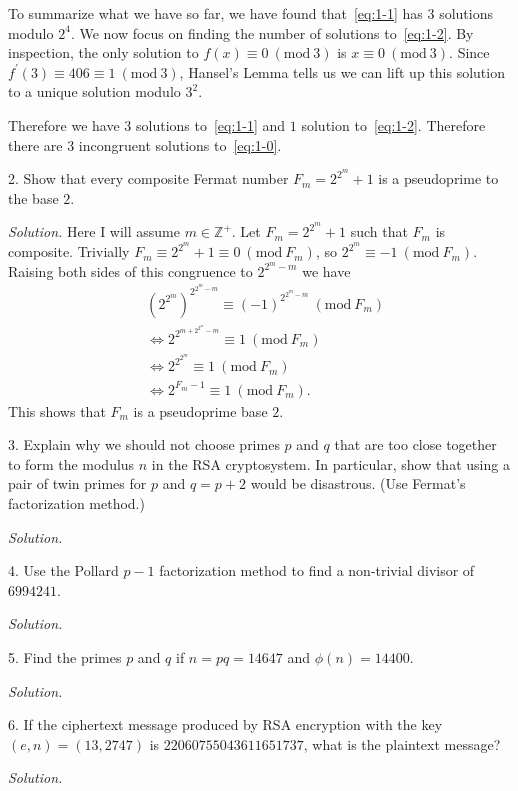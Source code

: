 \documentclass{article}
\newcommand{\Mod}[1]{\ (\mathrm{mod}\ #1)}
\newcommand{\Z}{\mathbb{Z}}
\begin{document}
To summarize what we have so far, we have found that~\eqref{eq:1-1} has
$3$ solutions modulo $2^4$. We now focus on finding the number of solutions
to~\eqref{eq:1-2}. By inspection, the only solution to $f(x) \equiv 0 \Mod 3$
is $x \equiv 0 \Mod 3$. Since $f^\prime(3) \equiv 406 \equiv 1 \Mod 3$,
Hansel's Lemma tells us we can lift up this solution to a unique solution
modulo $3^2$.

Therefore we have $3$ solutions to~\eqref{eq:1-1} and $1$ solution
to~\eqref{eq:1-2}. Therefore there are $3$ incongruent solutions
to~\eqref{eq:1-0}.

\newpage

2. Show that every composite Fermat number $F_m = 2^{2^m} + 1$ is a
pseudoprime to the base $2$.

\textit{Solution.}
Here I will assume $m \in \Z^+$. Let $F_m= 2^{2^m} + 1$ such that $F_m$
is composite. Trivially $F_m \equiv 2^{2^m} + 1 \equiv 0 \Mod{F_m}$,
so $2^{2^m} \equiv -1 \Mod{F_m}$. Raising both sides of this congruence
to $2^{2^m - m}$ we have
%
\begin{align*}
    &(2^{2^m})^{2^{2^m - m}} \equiv (-1)^{2^{2^m - m}} \Mod{F_m} \\
    &\iff 2^{2^{m + 2^{2^m} - m}} \equiv 1 \Mod{F_m} \\
    &\iff 2^{2^{2^m}} \equiv 1 \Mod{F_m} \\
    &\iff 2^{F_m - 1} \equiv 1 \Mod{F_m}
    .
\end{align*}
%
This shows that $F_m$ is a pseudoprime base $2$.

\newpage

3. Explain why we should not choose primes $p$ and $q$ that are too close
together to form the modulus $n$ in the RSA cryptosystem. In particular,
show that using a pair of twin primes for $p$ and $q = p + 2$ would be
disastrous. (Use Fermat's factorization method.)

\textit{Solution.}

\newpage

4. Use the Pollard $p - 1$ factorization method to find a non-trivial
divisor of $6994241$.

\textit{Solution.}

\newpage

5. Find the primes $p$ and $q$ if $n = p q = 14647$ and $\phi(n) = 14400$.

\textit{Solution.}

\newpage

6. If the ciphertext message produced by RSA encryption with the key
$(e, n) = (13, 2747)$ is $22060755043611651737$, what is the plaintext
message?

\textit{Solution.}
\end{document}
